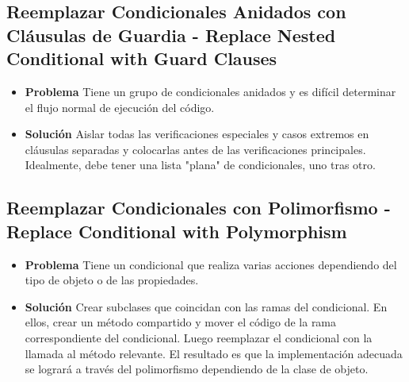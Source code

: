 \documentclass[11pt,a4paper,oneside]{book}
\begin{document}
\subsection{Reemplazar Condicionales Anidados con Cláusulas de Guardia - Replace Nested Conditional with Guard Clauses}     
 \begin{itemize}
    \item \textbf{Problema} Tiene un grupo de condicionales anidados y es difícil determinar el flujo normal de ejecución del código.
    
    
    
    \item \textbf{Solución} Aislar todas las verificaciones especiales y casos extremos en cláusulas separadas y colocarlas antes de las verificaciones principales. Idealmente, debe tener una lista "plana" de condicionales, uno tras otro.
    
    
\end{itemize}
    
\subsection{Reemplazar Condicionales con Polimorfismo - Replace Conditional with Polymorphism}     
\begin{itemize}
    \item \textbf{Problema} Tiene un condicional que realiza varias acciones dependiendo del tipo de objeto o de las propiedades.
    
    
    
    \item \textbf{Solución} Crear subclases que coincidan con las ramas del condicional. En ellos, crear un método compartido y mover el código de la rama correspondiente del condicional. Luego reemplazar el condicional con la llamada al método relevante. El resultado es que la implementación adecuada se logrará a través del polimorfismo dependiendo de la clase de objeto.
    
    
\end{itemize}
    
\end{document}
